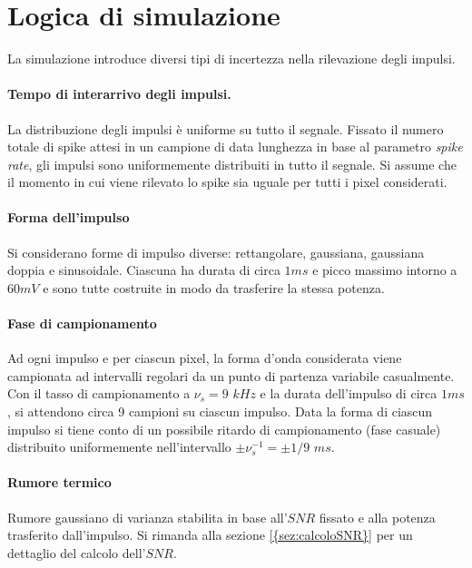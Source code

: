 \section{Logica di simulazione}

La simulazione introduce diversi tipi di incertezza nella rilevazione degli impulsi.

\paragraph{Tempo di interarrivo degli impulsi.}
La distribuzione degli impulsi è uniforme su tutto il segnale. Fissato il numero totale di spike attesi in un campione di data lunghezza in base al parametro {\it spike rate}, gli impulsi sono uniformemente distribuiti in tutto il segnale. Si assume che il momento in cui viene rilevato lo spike sia uguale per tutti i pixel considerati.


\paragraph{Forma dell'impulso}
Si considerano forme di impulso diverse: rettangolare, gaussiana, gaussiana doppia e sinusoidale. Ciascuna ha durata di circa $1ms$ e picco massimo intorno a $60mV$ e sono tutte costruite in modo da trasferire la stessa potenza.


\paragraph{Fase di campionamento}
Ad ogni impulso e per ciascun pixel, la forma d'onda considerata viene campionata ad intervalli regolari da un punto di partenza variabile casualmente.
Con il tasso di campionamento a $\nu_{s}=9$ $kHz$ e la durata dell'impulso di circa $1ms$, si attendono circa 9 campioni su ciascun impulso. Data la forma di ciascun impulso si tiene conto di un possibile ritardo di campionamento (fase casuale) distribuito uniformemente nell'intervallo $\pm \nu_{s}^{-1} = \pm 1/9$ $ms$.


\paragraph{Rumore termico}
Rumore gaussiano di varianza stabilita in base all'$SNR$ fissato e alla potenza trasferito dall'impulso.
Si rimanda alla sezione \ref{{sez:calcoloSNR}} per un dettaglio del calcolo dell'$SNR$.





